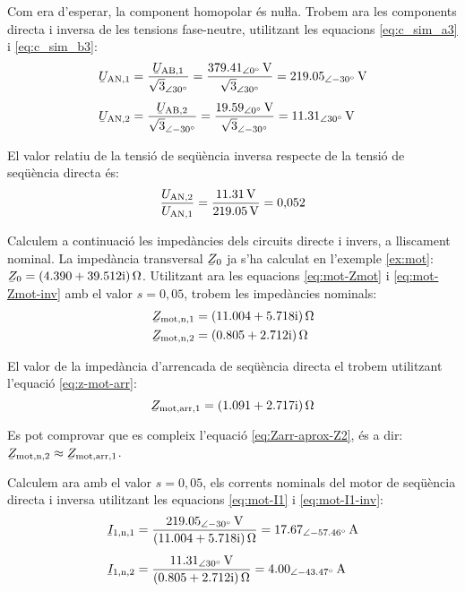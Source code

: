 \begin{exemple}
	Com era d'esperar, la component homopolar és nuŀla.	 Trobem ara les components directa i inversa
	de les tensions fase-neutre, utilitzant les equacions
	\eqref{eq:c_sim_a3} i \eqref{eq:c_sim_b3}:
	\begin{align*}
	\cmplx{U}\ped{AN,1} &=
	\frac{\cmplx{U}\ped{AB,1}}{\sqrt{3}_{\angle\ang{30}}} =
	\frac{\qtypd{379,41}{0}{V}}{\sqrt{3}_{\angle\ang{30}}} =
	\qtypd{219,05}{-30}{V} \\[1ex]
	\cmplx{U}\ped{AN,2} &=
	\frac{\cmplx{U}\ped{AB,2}}{\sqrt{3}_{\angle\ang{-30}}} =
	\frac{\qtypd{19,59}{0}{V}}{\sqrt{3}_{\angle\ang{-30}}} =
	\qtypd{11,31}{30}{V} 
	\end{align*}
	
	El valor relatiu de la tensió de seqüència inversa respecte de la tensió de seqüència directa és:
	\[
		\frac{U_\mathrm{AN,2}}{U_\mathrm{AN,1}} = \frac{\qty{11,31}{V}}{\qty{219,05}{V}} = 0{,}052
	\]
	
	Calculem a continuació les impedàncies dels circuits directe i invers, a lliscament nominal. La impedància transversal $\cmplx{Z}_0$ ja s'ha calculat en l'exemple \ref{ex:mot}: $ \cmplx{Z}_0 =  \complexqty{4,390+j39,512}{\ohm} $. Utilitzant ara les equacions \eqref{eq:mot-Zmot} i \eqref{eq:mot-Zmot-inv} amb el valor $s=0{,}05$, trobem les impedàncies nominals:
	\begin{align*}
		\cmplx{Z}\ped{mot,n,1} &= \complexqty{11,004+j5,718}{\ohm} \\
		\cmplx{Z}\ped{mot,n,2} &= \complexqty{0,805+j2,712}{\ohm}
	\end{align*}
	
	El valor de la impedància d'arrencada de seqüència directa el trobem utilitzant l'equació \eqref{eq:z-mot-arr}:
	\[
		\cmplx{Z}\ped{mot,arr,1} = \complexqty{1,091+j2,717}{\ohm}
	\]
	
	Es pot comprovar que es compleix l'equació \eqref{eq:Zarr-aprox-Z2}, és a dir: $\cmplx{Z}\ped{mot,n,2} \approx \cmplx{Z}\ped{mot,arr,1}$.
	
	Calculem ara amb el valor $s=0{,}05$, els corrents nominals del motor de seqüència directa i inversa utilitzant les equacions \eqref{eq:mot-I1} i \eqref{eq:mot-I1-inv}:
	\begin{align*}
		\cmplx{I}\ped{1,n,1} &=  \frac{\qtypd{219,05}{-30}{V}}{\complexqty{11,004+j5,718}{\ohm}} = \qtypd{17,67}{-57,46}{A} \\[1ex] 
		\cmplx{I}\ped{1,n,2} &= \frac{\qtypd{11,31}{30}{V}}{\complexqty{0,805+j2,712}{\ohm}} = \qtypd{4,00}{-43,47}{A}
	\end{align*}
	

\end{exemple}
